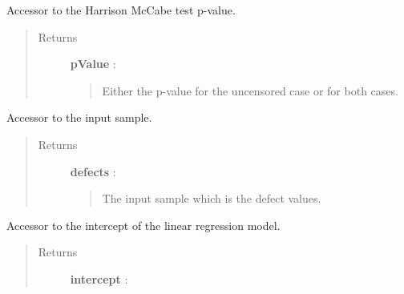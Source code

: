 \documentclass[letterpaper,10pt,english]{sphinxmanual}
\begin{document}
\begin{fulllineitems}
\begin{fulllineitems}
\label{_generated/otpod.UnivariateLinearModelAnalysis:otpod.UnivariateLinearModelAnalysis.getHarrisonMcCabePValue}
Accessor to the Harrison McCabe test p-value.
\begin{quote}\begin{description}
\item[{Returns}] \leavevmode
\textbf{pValue} : \href{http://doc.openturns.org/openturns-latest/sphinx/user\_manual/\_generated/openturns.NumericalPoint.html\#openturns.NumericalPoint}{}
\begin{quote}

Either the p-value for the uncensored case or for both cases.
\end{quote}

\end{description}\end{quote}

\end{fulllineitems}


\begin{fulllineitems}
\label{_generated/otpod.UnivariateLinearModelAnalysis:otpod.UnivariateLinearModelAnalysis.getInputSample}
Accessor to the input sample.
\begin{quote}\begin{description}
\item[{Returns}] \leavevmode
\textbf{defects} : \href{http://doc.openturns.org/openturns-latest/sphinx/user\_manual/\_generated/openturns.NumericalSample.html\#openturns.NumericalSample}{}
\begin{quote}

The input sample which is the defect values.
\end{quote}

\end{description}\end{quote}

\end{fulllineitems}


\begin{fulllineitems}
\label{_generated/otpod.UnivariateLinearModelAnalysis:otpod.UnivariateLinearModelAnalysis.getIntercept}
Accessor to the intercept of the linear regression model.
\begin{quote}\begin{description}
\item[{Returns}] \leavevmode
\textbf{intercept} : \href{http://doc.openturns.org/openturns-latest/sphinx/user\_manual/\_generated/openturns.NumericalPoint.html\#openturns.NumericalPoint}{}
\begin{quote}


\end{quote}
\end{description}
\end{quote}
\end{fulllineitems}
\end{fulllineitems}
\end{document}
